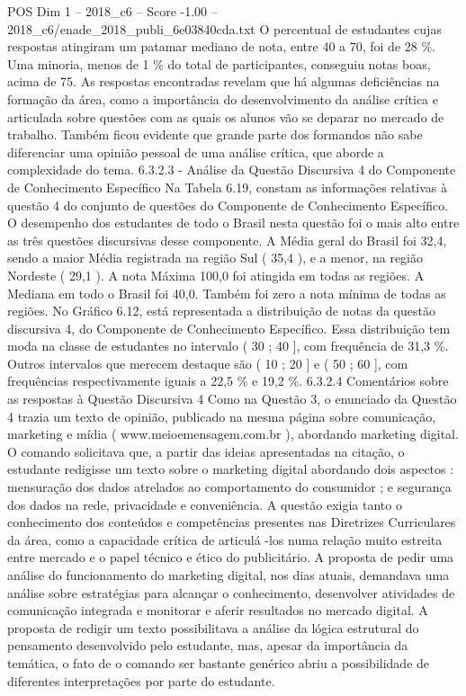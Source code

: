 \begin{textsample}{POS Dim 1 – 2018\_c6 – Score -1.00 – 2018\_c6/enade\_2018\_publi\_6e03840cda.txt}
O percentual de estudantes cujas respostas atingiram um patamar mediano de nota, entre 40 a 70, foi de 28 \%.
Uma minoria, menos de 1 \% do total de participantes, conseguiu notas boas, acima de 75.
As respostas encontradas revelam que há algumas deficiências na formação da área, como a importância do desenvolvimento da análise crítica e articulada sobre questões com as quais os alunos vão se deparar no mercado de trabalho.
Também ficou evidente que grande parte dos formandos não sabe diferenciar uma opinião pessoal de uma análise crítica, que aborde a complexidade do tema. 6.3.2.3 - Análise da Questão Discursiva 4 do Componente de Conhecimento Específico Na Tabela 6.19, constam as informações relativas à questão 4 do conjunto de questões do Componente de Conhecimento Específico.
O desempenho dos estudantes de todo o Brasil nesta questão foi o mais alto entre as três questões discursivas desse componente.
A Média geral do Brasil foi 32,4, sendo a maior Média registrada na região Sul ( 35,4 ), e a menor, na região Nordeste ( 29,1 ).
A nota Máxima 100,0 foi atingida em todas as regiões.
A Mediana em todo o Brasil foi 40,0.
Também foi zero a nota mínima de todas as regiões.
No Gráfico 6.12, está representada a distribuição de notas da questão discursiva 4, do Componente de Conhecimento Específico.
Essa distribuição tem moda na classe de estudantes no intervalo ( 30 ; 40 ], com frequência de 31,3 \%.
Outros intervalos que merecem destaque são ( 10 ; 20 ] e ( 50 ; 60 ], com frequências respectivamente iguais a 22,5 \% e 19,2 \%. 6.3.2.4 Comentários sobre as respostas à Questão Discursiva 4 Como na Questão 3, o enunciado da Questão 4 trazia um texto de opinião, publicado na mesma página sobre comunicação, marketing e mídia ( www.meioemensagem.com.br ), abordando marketing digital.
O comando solicitava que, a partir das ideias apresentadas na citação, o estudante redigisse um texto sobre o marketing digital abordando dois aspectos : mensuração dos dados atrelados ao comportamento do consumidor ; e segurança dos dados na rede, privacidade e conveniência.
A questão exigia tanto o conhecimento dos conteúdos e competências presentes nas Diretrizes Curriculares da área, como a capacidade crítica de articulá -los numa relação muito estreita entre mercado e o papel técnico e ético do publicitário.
A proposta de pedir uma análise do funcionamento do marketing digital, nos dias atuais, demandava uma análise sobre estratégias para alcançar o conhecimento, desenvolver atividades de comunicação integrada e monitorar e aferir resultados no mercado digital.
A proposta de redigir um texto possibilitava a análise da lógica estrutural do pensamento desenvolvido pelo estudante, mas, apesar da importância da temática, o fato de o comando ser bastante genérico abriu a possibilidade de diferentes interpretações por parte do estudante.

\end{textsample}
